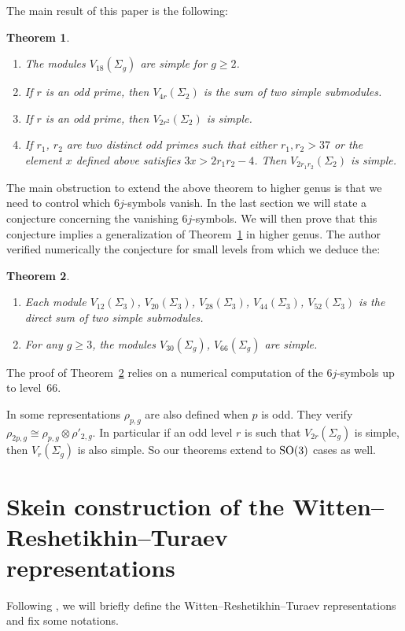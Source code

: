 \documentclass[pdftex]{sigma}
\numberwithin{equation}{section}
\newtheorem{Theorem}{Theorem}[section]
\begin{document}
The main result of this paper is the following:
\begin{Theorem}\label{main_th}\quad
\begin{enumerate}\itemsep=0pt
\item[$1.$] The modules $V_{18}(\Sigma_g)$ are simple for $g\geq 2$.
\item[$2.$] If $r$ is an odd prime, then $V_{4r}(\Sigma_2)$ is the sum of two simple submodules.
\item[$3.$] If $r$ is an odd prime, then $V_{2r^2}(\Sigma_2)$ is simple.
\item[$4.$] If $r_1$, $r_2$ are two distinct odd primes such that either $r_1,r_2>37$ or the element $x$ defined above satisfies $3x>2r_1r_2-4$. Then $V_{2r_1r_2}(\Sigma_2)$ is simple.
\end{enumerate}
\end{Theorem}

The main obstruction to extend the above theorem to higher genus is that we need to control which $6j$-symbols vanish. In the last section we will state a conjecture concerning the vanishing $6j$-symbols. We will then prove that this conjecture implies a generalization of Theorem~\ref{main_th} in higher genus. The author verified numerically the conjecture for small levels from which we deduce the:
\begin{Theorem}\label{theorem_high_genus} \quad
\begin{enumerate}\itemsep=0pt
\item[$1.$] Each module $V_{12}(\Sigma_3)$, $V_{20}(\Sigma_3)$, $V_{28}(\Sigma_3)$, $V_{44}(\Sigma_3)$, $V_{52}(\Sigma_3)$ is the direct sum of two simple submodules.
\item[$2.$] For any $g\geq 3$, the modules $V_{30}(\Sigma_g)$, $V_{66}(\Sigma_g)$ are simple.
\end{enumerate}
\end{Theorem}

The proof of Theorem~\ref{theorem_high_genus} relies on a numerical computation of the $6j$-symbols up to level~$66$.
\begin{Remark}In \cite{BHMV2} some representations $\rho_{p,g}$ are also defined when $p$ is odd. They verify $\rho_{2p,g}\cong \rho_{p,g}\otimes \rho'_{2,g}$. In particular if an odd level $r$ is such that $V_{2r}(\Sigma_g)$ is simple, then $V_{r}(\Sigma_g)$ is also simple. So our theorems extend to ${\rm SO}(3)$ cases as well.
\end{Remark}

\section[Skein construction of the Witten--Reshetikhin--Turaev representations]{Skein construction of the Witten--Reshetikhin--Turaev\\ representations}\label{section2}
Following \cite{BHMV2}, we will briefly define the Witten--Reshetikhin--Turaev representations and fix some notations.
\end{document}
